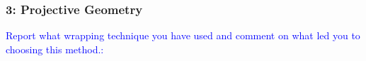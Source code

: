 \documentclass[../main.tex]{subfiles}
\begin{document}
    
    \begin{frame}
        \frametitle{3: Projective Geometry}
        \selectfont\textcolor{blue}{Report what wrapping technique you have used and comment on what led you to choosing this method.:} \\
                
        \vspace*{\fill}
    \end{frame}
    
\end{document}
